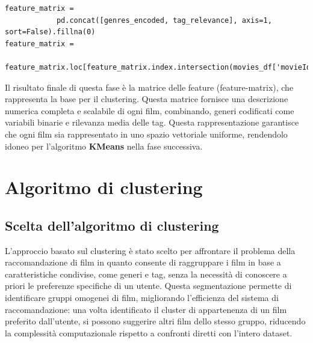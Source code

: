 \documentclass[a4paper,12pt]{article}
\begin{document}
\begin{enumerate}
\begin{verbatim}
feature_matrix = 
			pd.concat([genres_encoded, tag_relevance], axis=1, sort=False).fillna(0)
feature_matrix = 
			feature_matrix.loc[feature_matrix.index.intersection(movies_df['movieId'])]
\end{verbatim}
					Il risultato finale di questa fase è la matrice delle feature (feature-matrix), che rappresenta la base per il clustering. Questa matrice fornisce una descrizione numerica completa e scalabile di ogni film, combinando, generi codificati come variabili binarie e rilevanza media delle tag. Questa rappresentazione garantisce che ogni film sia rappresentato in uno spazio vettoriale uniforme, rendendolo idoneo per l'algoritmo \textbf{KMeans} nella fase successiva.

		\end{enumerate}
\newpage
\section{Algoritmo di clustering}
    \subsection{Scelta dell’algoritmo di clustering}
L'approccio basato sul clustering è stato scelto per affrontare il problema della raccomandazione di film in quanto consente di raggruppare i film in base a caratteristiche condivise, come generi e tag, senza la necessità di conoscere a priori le preferenze specifiche di un utente. Questa segmentazione permette di identificare gruppi omogenei di film, migliorando l'efficienza del sistema di raccomandazione: una volta identificato il cluster di appartenenza di un film preferito dall’utente, si possono suggerire altri film dello stesso gruppo, riducendo la complessità computazionale rispetto a confronti diretti con l’intero dataset.
\end{document}
